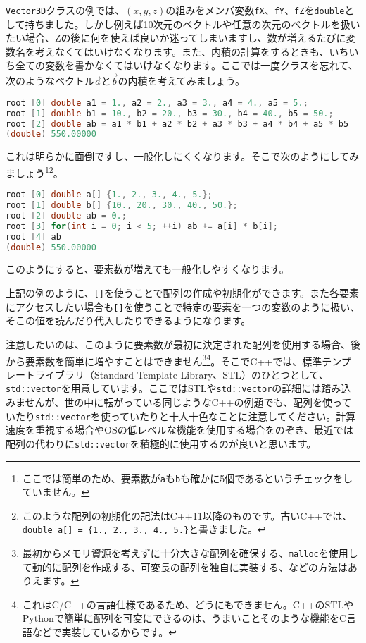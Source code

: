 \texttt{Vector3D}クラスの例では、$(x, y, z)$の組みをメンバ変数\texttt{fX}、\texttt{fY}、\texttt{fZ}を\texttt{double}として持ちました。しかし例えば10次元のベクトルや任意の次元のベクトルを扱いたい場合、Zの後に何を使えば良いか迷ってしまいますし、数が増えるたびに変数名を考えなくてはいけなくなります。また、内積の計算をするときも、いちいち全ての変数を書かなくてはいけなくなります。ここでは一度クラスを忘れて、次のようなベクトル$\vec{a}$と$\vec{b}$の内積を考えてみましょう。
\begin{lstlisting}[language=c++]
root [0] double a1 = 1., a2 = 2., a3 = 3., a4 = 4., a5 = 5.;
root [1] double b1 = 10., b2 = 20., b3 = 30., b4 = 40., b5 = 50.;
root [2] double ab = a1 * b1 + a2 * b2 + a3 * b3 + a4 * b4 + a5 * b5
(double) 550.00000
\end{lstlisting}
これは明らかに面倒ですし、一般化しにくくなります。そこで次のようにしてみましょう\footnote{ここでは簡単のため、要素数が\texttt{a}も\texttt{b}も確かに5個であるというチェックをしていません。}\footnote{このような配列の初期化の記法はC++11以降のものです。古いC++では、\texttt{double a[] = \{1., 2., 3., 4., 5.\}}と書きました。}。
\begin{lstlisting}[language=c++]
root [0] double a[] {1., 2., 3., 4., 5.};
root [1] double b[] {10., 20., 30., 40., 50.};
root [2] double ab = 0.;
root [3] for(int i = 0; i < 5; ++i) ab += a[i] * b[i];
root [4] ab
(double) 550.00000
\end{lstlisting}
このようにすると、要素数が増えても一般化しやすくなります。

上記の例のように、\texttt{[]}を使うことで配列の作成や初期化ができます。また各要素にアクセスしたい場合も\texttt{[]}を使うことで特定の要素を一つの変数のように扱い、そこの値を読んだり代入したりできるようになります。

注意したいのは、このように要素数が最初に決定された配列を使用する場合、後から要素数を簡単に増やすことはできません\footnote{最初からメモリ資源を考えずに十分大きな配列を確保する、\texttt{malloc}を使用して動的に配列を作成する、可変長の配列を独自に実装する、などの方法はありえます。}\footnote{これはC/C++の言語仕様であるため、どうにもできません。C++のSTLやPythonで簡単に配列を可変にできるのは、うまいことそのような機能をC言語などで実装しているからです。}。そこでC++では、標準テンプレートライブラリ（Standard Template Library、STL）のひとつとして、\texttt{std::vector}を用意しています。ここではSTLや\texttt{std::vector}の詳細には踏み込みませんが、世の中に転がっている同じようなC++の例題でも、配列を使っていたり\texttt{std::vector}を使っていたりと十人十色なことに注意してください。計算速度を重視する場合やOSの低レベルな機能を使用する場合をのぞき、最近では配列の代わりに\texttt{std::vector}を積極的に使用するのが良いと思います。

